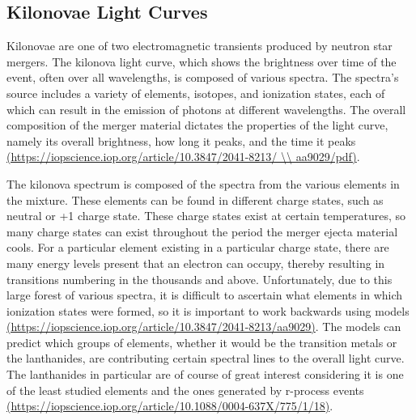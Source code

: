 \documentclass[11pt,a4paper]{article}
\begin{document}
\subsection{Kilonovae Light Curves}

Kilonovae are one of two electromagnetic transients produced by neutron star mergers. The kilonova light curve, which shows the brightness over time of the event, often over all wavelengths, is composed of various spectra. The spectra's source includes a variety of elements, isotopes, and ionization states, each of which can result in the emission of photons at different wavelengths. The overall composition of the merger material dictates the properties of the light curve, namely its overall brightness, how long it peaks, and the time it peaks \url{(https://iopscience.iop.org/article/10.3847/2041-8213/ \\ aa9029/pdf)}.

The kilonova spectrum is composed of the spectra from the various elements in the mixture. These elements can be found in different charge states, such as neutral or +1 charge state. These charge states exist at certain temperatures, so many charge states can exist throughout the period the merger ejecta material cools. For a particular element existing in a particular charge state, there are many energy levels present that an electron can occupy, thereby resulting in transitions numbering in the thousands and above.
Unfortunately, due to this large forest of various spectra, it is difficult to ascertain what elements in which ionization states were formed, so it is important to work backwards using models  \url{(https://iopscience.iop.org/article/10.3847/2041-8213/aa9029)}. The models can predict which groups of elements, whether it would be the transition metals or the lanthanides, are contributing certain spectral lines to the overall light curve. The lanthanides in particular are of course of great interest considering it is one of the least studied elements and the ones generated by r-process events \url{(https://iopscience.iop.org/article/10.1088/0004-637X/775/1/18)}.
\end{document}

